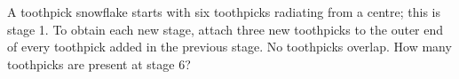 A toothpick snowflake starts with six toothpicks radiating from a centre; this is stage 1. To obtain each new stage, attach three new toothpicks to the outer end of every toothpick added in the previous stage. No toothpicks overlap. How many toothpicks are present at stage 6?
